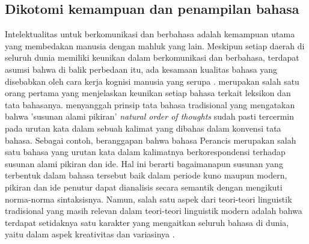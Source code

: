 \subsection{Dikotomi kemampuan dan penampilan bahasa}
Intelektualitas untuk berkomunikasi dan berbahasa adalah kemampuan utama yang membedakan manusia dengan mahluk yang lain. Meskipun setiap daerah di seluruh dunia memiliki keunikan dalam berkomunikasi dan berbahasa, terdapat asumsi bahwa di balik perbedaan itu, ada kesamaan kualitas bahasa yang disebabkan oleh cara kerja kognisi manusia yang serupa \citep{sapir1921intro, chomsky1965syntactic}. \cite{beattie1788theory} merupakan salah satu orang pertama yang menjelaskan keunikan setiap bahasa terkait leksikon dan tata bahasanya. \cite{chomsky1965syntactic} menyanggah prinsip tata bahasa tradisional yang mengatakan bahwa 'susunan alami pikiran' \textit{natural order of thoughts} sudah pasti tercermin pada urutan kata dalam sebuah kalimat yang dibahas dalam konvensi tata bahasa. Sebagai contoh, \cite{diderot1751lettre} beranggapan bahwa bahasa Perancis merupakan salah satu bahasa yang urutan kata dalam kalimatnya berkorespondensi terhadap susunan alami pikiran dan ide. Hal ini berarti bagaimanapun susunan yang terbentuk dalam bahasa tersebut baik dalam periode kuno maupun modern, pikiran dan ide penutur dapat dianalisis secara semantik dengan mengikuti norma-norma sintaksisnya. Namun, salah satu aspek dari teori-teori linguistik tradisional yang masih relevan dalam teori-teori linguistik modern adalah bahwa terdapat setidaknya satu karakter yang mengaitkan seluruh bahasa di dunia, yaitu dalam aspek kreativitas dan variasinya \citep{hawkins2014cross}.


